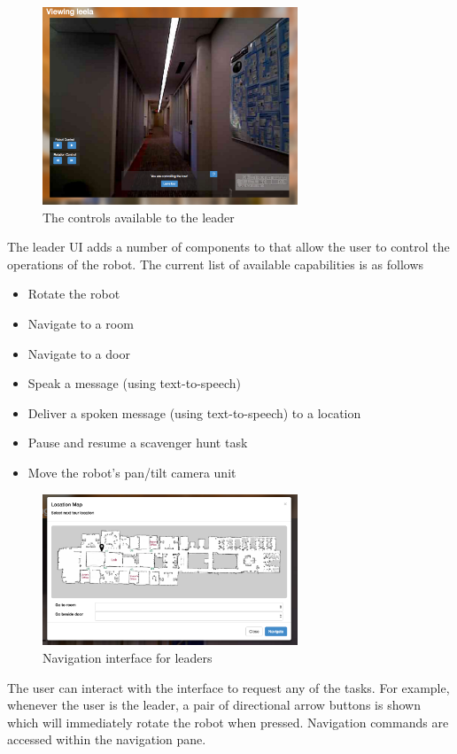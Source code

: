 \documentclass[
  oneside,
  11pt, a4paper,
  footinclude=true,
  headinclude=true,
  cleardoublepage=empty
]{article}
\begin{document}
\begin{figure}
  \centering
  \includegraphics[width=3in]{leader_ui}
  \caption{The controls available to the leader}
  \label{fig:leader_controls}
\end{figure}

The leader UI adds a number of components to that allow the user to
control the operations of the robot. The current list of available capabilities
is as follows

\begin{itemize}
  \item Rotate the robot
  \item Navigate to a room 
  \item Navigate to a door 
  \item Speak a message (using text-to-speech)
  \item Deliver a spoken message (using text-to-speech) to a location
  \item Pause and resume a scavenger hunt task
  \item Move the robot's pan/tilt camera unit
\end{itemize}

\begin{figure}
  \centering
  \includegraphics[width=3in]{nav_ui}
  \caption{Navigation interface for leaders}
  \label{fig:nav_interface}
\end{figure}

The user can interact with the interface to request any of the tasks. For
example, whenever the user is the leader, a pair of directional arrow buttons
is shown which will immediately rotate the robot when pressed. Navigation
commands are accessed within the navigation pane.
\end{document}
